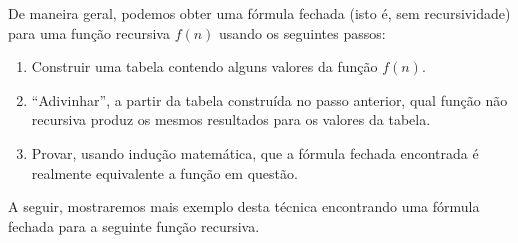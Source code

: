 De maneira geral, podemos obter uma fórmula fechada (isto é, sem
recursividade) para uma função recursiva $f(n)$ usando os seguintes
passos:
\begin{enumerate}
  \item Construir uma tabela contendo alguns valores da função $f(n)$.
  \item ``Adivinhar'', a partir da tabela construída no passo
    anterior, qual função não recursiva produz os mesmos resultados
    para os valores da tabela.
  \item Provar, usando indução matemática, que a fórmula fechada
    encontrada é realmente equivalente a função em questão.
\end{enumerate}
A seguir, mostraremos mais exemplo desta técnica encontrando uma
fórmula fechada para a seguinte função recursiva.

